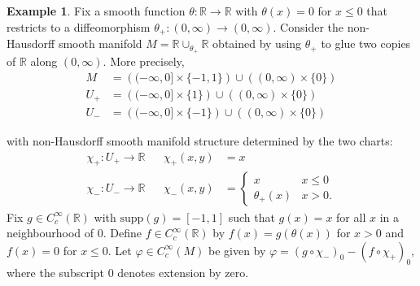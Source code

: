\documentclass[12pt]{article}
\theoremstyle{plain}
\theoremstyle{definition}
\newtheorem{ex}[thm]{Example}
\newcommand{\R}{\mathbb{R}}
\numberwithin{equation}{section}
\begin{document}
\begin{ex}\label{supbad}
Fix a smooth function $\theta : \R \to \R$ with $\theta(x)=0$ for $x \leq 0$ that restricts to a  diffeomorphism $\theta_+:(0,\infty)\to(0,\infty)$. Consider the non-Hausdorff smooth manifold $M = \R \cup_{\theta_+} \R$ obtained by using $\theta_+$ to glue two copies of $\R$ along $(0,\infty)$.  More precisely, 
\begin{align*}
M&=\left((-\infty,0] \times \{-1,1\}  \right)\cup \left( (0,\infty) \times \{0\} \right)  \\
U_+ &= \left((-\infty,0] \times \{1\}  \right)\cup \left( (0,\infty) \times \{0\} \right)\\
U_- &= \left((-\infty,0] \times \{-1\}  \right)\cup \left( (0,\infty) \times \{0\} \right) 
\end{align*}
\begin{center}
\hfill
\end{center}
with non-Hausdorff smooth manifold structure determined by the two charts:
\begin{align*}
\chi_+: U_+ \to \R && \chi_+(x,y)&= x  \\
\chi_-: U_- \to \R && \chi_-(x,y) &= \begin{cases}
x & x \leq 0 \\
\theta_+(x) & x > 0.
\end{cases} 
\end{align*}
Fix  $g \in C_c^\infty(\R)$ with $\mathrm{supp}(g)=[-1,1]$ such that $g(x)=x$ for all $x$ in a neighbourhood of $0$. Define $f \in C_c^\infty(\R)$ by $f(x)=g(\theta(x))$ for $x>0$ and $f(x)=0$ for $x \leq 0$. Let $\varphi \in C_c^\infty(M)$ be given by $\varphi = (g \circ \chi_-)_0 - (f \circ \chi_+)_0$, where the subscript $0$ denotes extension by zero.
\begin{center}
\hfill
{}
\end{center}
\end{ex}
\end{document}
